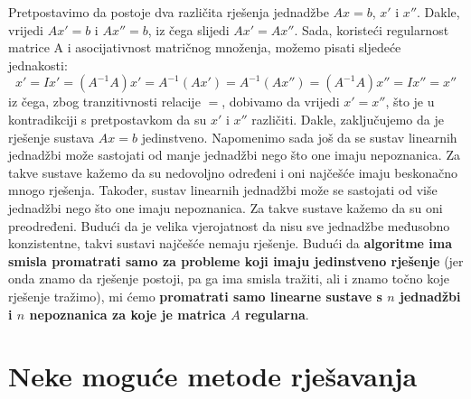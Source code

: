 \documentclass[a4paper,12pt,oneside]{article}
\begin{document}
\noindent Pretpostavimo da postoje dva različita rješenja jednadžbe $Ax = b$, $x'$ i $x''$. Dakle, vrijedi $Ax' = b$ i $Ax'' = b$, iz čega slijedi $Ax' = Ax''$. \newline
\noindent Sada, koristeći regularnost matrice A i asocijativnost matričnog množenja, možemo pisati sljedeće jednakosti:
$$x' = Ix' = (A^{-1}A)x' = A^{-1}(Ax') = A^{-1}(Ax'') = (A^{-1}A)x'' = Ix'' = x''$$
iz čega, zbog tranzitivnosti relacije $=$, dobivamo da vrijedi $x' = x''$, što je u kontradikciji s pretpostavkom da su $x'$ i $x''$ različiti.
Dakle, zaključujemo da je rješenje sustava $Ax = b$ jedinstveno.
\newline\newline
\noindent
Napomenimo sada još da se sustav linearnih jednadžbi može sastojati od manje jednadžbi nego što one imaju nepoznanica. Za takve sustave kažemo da su nedovoljno određeni i oni najčešće imaju beskonačno mnogo rješenja. Također, sustav linearnih jednadžbi može se sastojati od više jednadžbi nego što one imaju nepoznanica. Za takve sustave kažemo da su oni preodređeni. Budući da je velika vjerojatnost da nisu sve jednadžbe međusobno konzistentne, takvi sustavi najčešće nemaju rješenje. Budući da \textbf{algoritme ima smisla promatrati samo za probleme koji imaju jedinstveno rješenje} (jer onda znamo da rješenje postoji, pa ga ima smisla tražiti, ali i znamo točno koje rješenje tražimo), mi ćemo \textbf{promatrati samo linearne sustave s $n$ jednadžbi i $n$ nepoznanica za koje je matrica $A$ regularna}. 

\section*{Neke moguće metode rješavanja}
\end{document}
